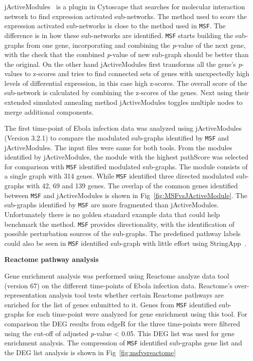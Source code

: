 \documentclass[10pt,a4paper,twocolumn]{article}
\begin{document}
	jActiveModules~\cite{jActiveModules} is a plugin in Cytoscape that searches for molecular
        interaction network to find expression activated
        sub-networks. The method used to score the expression
        activated sub-networks is close to the method used in
        \texttt{MSF}. The difference is in how these sub-networks are identified. \texttt{MSF} starts building the sub-graphs from one gene, incorporating and combining the \textit{p}-value of the next gene, with the check that the combined \textit{p}-value of new sub-graph should be better than the original. On the other hand jActiveModules first transforms all the gene’s \textit{p}-values to z-scores and tries to find connected sets of genes with unexpectedly high levels of differential expression, in this case high z-scores. The overall score of the sub-network is calculated by combining the z-scores of the genes. Next using their extended simulated annealing method jActiveModules toggles multiple nodes to merge additional components. 
	
	The first time-point of Ebola infection data was analyzed
        using jActiveModules (Version 3.2.1) to compare the modulated
        sub-graphs identified by \texttt{MSF} and jActiveModules. The
        input files were same for both tools. From the modules identified by jActiveModules, the module with the highest pathScore was selected for comparison with
        \texttt{MSF} identified modulated sub-graphs. The module consists of a single graph with 314
        genes. While \texttt{MSF} identified three directed modulated
        sub-graphs with 42, 69 and 139 genes. The overlap of the
        common genes identified between \texttt{MSF} and jActiveModules
        is shown in Fig~\ref{fig:MSFvsJActiveModule}. The sub-graphs identified by \texttt{MSF} are more fragmented than jActiveModules. Unfortunately there is no golden standard example data that could help benchmark the method. \texttt{MSF} provides directionality,
        with the identification of possible perturbation sources of
        the sub-graphs. The predefined pathway labels could also be seen in \texttt{MSF} identified sub-graph with little effort using StringApp~\cite{StringApp}.
        
     

	\textbf{Reactome pathway analysis}
	
	Gene enrichment analysis was performed using Reactome analyze
        data tool~\cite{Reactome} (version 67) on the different time-points of Ebola infection data. Reactome's over-representation analysis tool tests
        whether certain Reactome pathways are enriched for the list of
        genes submitted to it. Genes from \texttt{MSF} identified
        sub-graphs for each time-point were analyzed for gene
        enrichment using this tool.  For comparison the DEG results
        from edgeR for the three time-points were filtered using the
        cut-off of adjusted \textit{p}-value < 0.05. This
        DEG list was used for gene enrichment analysis. The
        compression of \texttt{MSF} identified sub-graphs gene list
        and the DEG list analysis is shown in
        Fig~\ref{fig:msfvsreactome}
	
\end{document}
